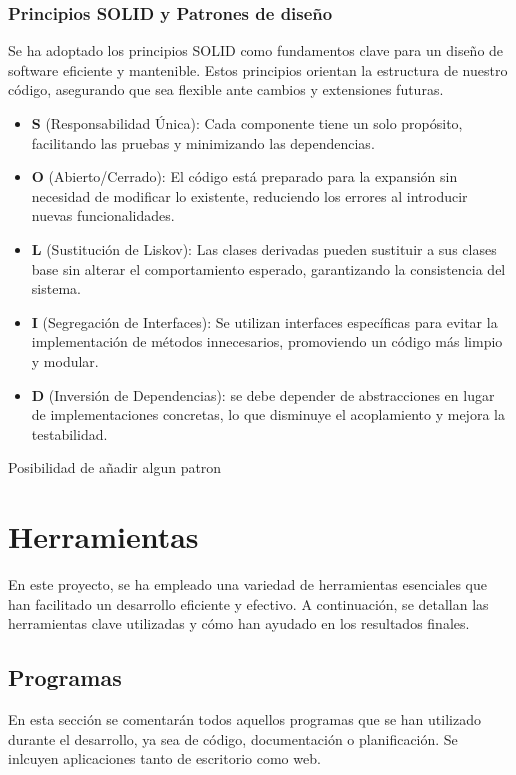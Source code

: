 \subsubsection{Principios SOLID y Patrones de diseño}
Se ha adoptado los principios SOLID como fundamentos clave para un diseño de software eficiente y mantenible. Estos principios orientan la estructura de nuestro código, asegurando que sea flexible ante cambios y extensiones futuras. 
\begin{mdframed}[linewidth=1pt, linecolor=black, leftmargin=10, rightmargin=10, backgroundcolor=gray!10, roundcorner=30pt]
		\begin{itemize}
		\item \textbf{S} (Responsabilidad Única): Cada componente tiene un solo propósito, facilitando las pruebas y minimizando las dependencias.
		\item \textbf{O} (Abierto/Cerrado): El código está preparado para la expansión sin necesidad de modificar lo existente, reduciendo los errores al introducir nuevas funcionalidades.
		\item \textbf{L} (Sustitución de Liskov): Las clases derivadas pueden sustituir a sus clases base sin alterar el comportamiento esperado, garantizando la consistencia del sistema.
		\item \textbf{I} (Segregación de Interfaces): Se utilizan interfaces específicas para evitar la implementación de métodos innecesarios, promoviendo un código más limpio y modular.
		\item \textbf{D} (Inversión de Dependencias): se debe depender de abstracciones en lugar de implementaciones concretas, lo que disminuye el acoplamiento y mejora la testabilidad.
	\end{itemize}
\end{mdframed}
Posibilidad de añadir algun patron
\section{Herramientas}
En este proyecto, se ha empleado una variedad de herramientas esenciales que han facilitado un desarrollo eficiente y efectivo. A continuación, se detallan las herramientas clave utilizadas y cómo han ayudado en los resultados finales.
\subsection{Programas}
En esta sección se comentarán todos aquellos programas que se han utilizado durante el desarrollo, ya sea de código, documentación o planificación. Se inlcuyen aplicaciones tanto de escritorio como web.

